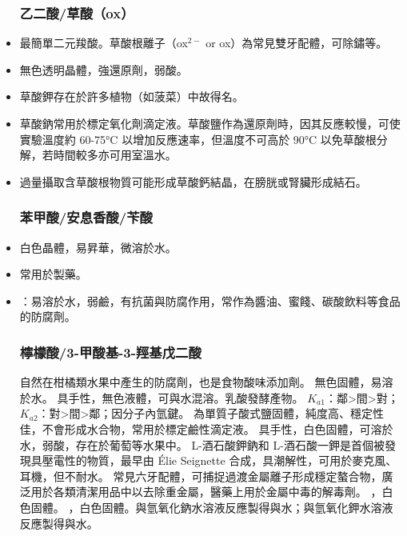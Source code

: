 \documentclass[a4paper,12pt]{report}
\begin{document}
\begin{itemize}
\subsubsection{乙二酸/草酸（ox）}
\bit
\item 最簡單二元羧酸。草酸根離子（ox$^{2-}$ or ox）為常見雙牙配體，可除鏽等。
\item 無色透明晶體，強還原劑，弱酸。
\item 草酸鉀存在於許多植物（如菠菜）中故得名。
\item 草酸鈉常用於標定氧化劑滴定液。草酸鹽作為還原劑時，因其反應較慢，可使實驗溫度約 60-75°C 以增加反應速率，但溫度不可高於 90°C 以免草酸根分解，若時間較多亦可用室溫水。
\item 過量攝取含草酸根物質可能形成草酸鈣結晶，在膀胱或腎臟形成結石。
\eit
\subsubsection{苯甲酸/安息香酸/苄酸}
\bit
\item 白色晶體，易昇華，微溶於水。
\item 常用於製藥。
\item {}：易溶於水，弱鹼，有抗菌與防腐作用，常作為醬油、蜜餞、碳酸飲料等食品的防腐劑。
\eit
\subsubsection{檸檬酸/3-甲酸基-3-羥基戊二酸}
自然在柑橘類水果中產生的防腐劑，也是食物酸味添加劑。
無色固體，易溶於水。
具手性，無色液體，可與水混溶。乳酸發酵產物。
$K_{a1}$：鄰>間>對；$K_{a2}$：對>間>鄰；因分子內氫鍵。
為單質子酸式鹽固體，純度高、穩定性佳，不會形成水合物，常用於標定鹼性滴定液。
具手性，白色固體，可溶於水，弱酸，存在於葡萄等水果中。
L-酒石酸鉀鈉和 L-酒石酸一鉀是首個被發現具壓電性的物質，最早由 Élie Seignette 合成，具潮解性，可用於麥克風、耳機，但不耐水。
常見六牙配體，可捕捉過渡金屬離子形成穩定螯合物，廣泛用於各類清潔用品中以去除重金屬，醫藥上用於金屬中毒的解毒劑。
，白色固體。
，白色固體。與氫氧化鈉水溶液反應製得與水；與氫氧化鉀水溶液反應製得與水。

\end{itemize}
\end{document}
